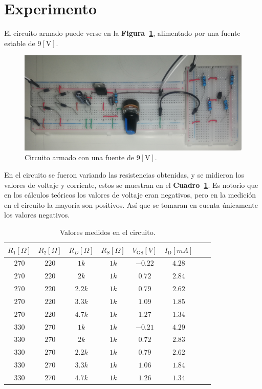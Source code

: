 \documentclass[letter,twoside,11pt]{article}
\begin{document}
\section{Experimento}
El circuito armado puede verse en la \textbf{Figura~\ref{armado1}}, alimentado
por una fuente estable de $9[\text{V}]$.

\begin{figure}[!h]
\centering
\includegraphics[scale=0.17]{fotos/circuito1.eps}
\caption{Circuito armado con una fuente de $9[\text{V}]$.}
\label{armado1}
\end{figure}

En el circuito se fueron variando las resistencias obtenidas, y se midieron los
valores de voltaje y corriente, estos se muestran en el
\textbf{Cuadro~\ref{armado2}}. Es notorio que en los cálculos teóricos los
valores de voltaje eran negativos, pero en la medición en el circuito la mayoría
son positivos. Así que se tomaran en cuenta únicamente los valores negativos.

\begin{table}[!h]
\begin{center}
    \begin{tabular}{|c|c|c|c||c|c|c|c|}
    \hline
    $R_1[\Omega]$ & $R_2[\Omega]$ & $R_D[\Omega]$ & $R_S[\Omega]$ &
    $V_{\text{GS}}[V]$ &
    $I_{\text{D}}[m{A}]$
    \tabularnewline \hline \hline
    $270$ & $220$ & $  1k$ & $1k$ & $-0.22$ & $4.28$ \tabularnewline \hline
    $270$ & $220$ & $  2k$ & $1k$ & $ 0.72$ & $2.84$ \tabularnewline \hline
    $270$ & $220$ & $2.2k$ & $1k$ & $ 0.79$ & $2.62$ \tabularnewline \hline
    $270$ & $220$ & $3.3k$ & $1k$ & $ 1.09$ & $1.85$ \tabularnewline \hline
    $270$ & $220$ & $4.7k$ & $1k$ & $ 1.27$ & $1.34$ \tabularnewline \hline
    $330$ & $270$ & $  1k$ & $1k$ & $-0.21$ & $4.29$ \tabularnewline \hline
    $330$ & $270$ & $  2k$ & $1k$ & $ 0.72$ & $2.83$ \tabularnewline \hline
    $330$ & $270$ & $2.2k$ & $1k$ & $ 0.79$ & $2.62$ \tabularnewline \hline
    $330$ & $270$ & $3.3k$ & $1k$ & $ 1.06$ & $1.84$ \tabularnewline \hline
    $330$ & $270$ & $4.7k$ & $1k$ & $ 1.26$ & $1.34$ \tabularnewline \hline
    \end{tabular}
\end{center}
\caption{Valores medidos en el circuito.}
\label{armado2}
\end{table}
\end{document}
